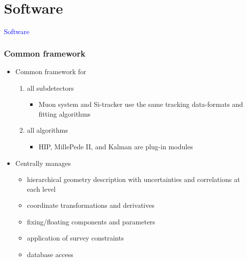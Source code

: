 \documentclass[compress]{beamer}
\begin{document}
\section*{Software}

\begin{frame}
\begin{center}
\Huge \textcolor{blue}{Software}
\end{center}
\end{frame}

\begin{frame}
\frametitle{Common framework}
\begin{itemize}
\item Common framework for
\begin{enumerate}
\item all subdetectors
\begin{itemize}
\item Muon system and Si-tracker use the same tracking data-formats and fitting algorithms
\end{itemize}

\item all algorithms
\begin{itemize}
\item HIP, MillePede II, and Kalman are plug-in modules
\end{itemize}
\end{enumerate}

\vfill
\item Centrally manages
\begin{itemize}
\item hierarchical geometry description with uncertainties and correlations at each level
\item coordinate transformations and derivatives
\item fixing/floating components and parameters
\item application of survey constraints
\item database access
\end{itemize}
\end{itemize}
\end{frame}
\end{document}
